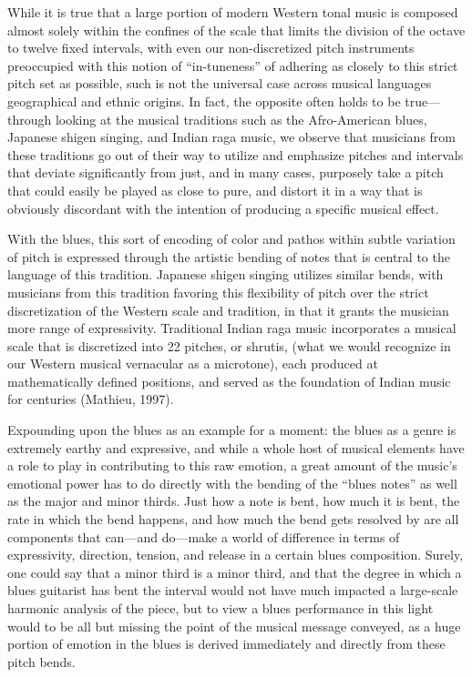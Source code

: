 While it is true that a large portion of modern Western tonal music is
composed almost solely within the confines of the scale that limits the
division of the octave to twelve fixed intervals, with even our
non-discretized pitch instruments preoccupied with this notion of
``in-tuneness'' of adhering as closely to this strict pitch set as
possible, such is not the universal case across musical languages
geographical and ethnic origins. In fact, the opposite often holds to be
true---through looking at the musical traditions such as the
Afro-American blues, Japanese shigen singing, and Indian raga music, we
observe that musicians from these traditions go out of their way to
utilize and emphasize pitches and intervals that deviate significantly
from just, and in many cases, purposely take a pitch that could easily
be played as close to pure, and distort it in a way that is obviously
discordant with the intention of producing a specific musical effect.

With the blues, this sort of encoding of color and pathos within subtle
variation of pitch is expressed through the artistic bending of notes
that is central to the language of this tradition. Japanese shigen
singing utilizes similar bends, with musicians from this tradition
favoring this flexibility of pitch over the strict discretization of the
Western scale and tradition, in that it grants the musician more range
of expressivity. Traditional Indian raga music incorporates a musical
scale that is discretized into 22 pitches, or shrutis, (what we would
recognize in our Western musical vernacular as a microtone), each
produced at mathematically defined positions, and served as the
foundation of Indian music for centuries (Mathieu, 1997).

Expounding upon the blues as an example for a moment: the blues as a
genre is extremely earthy and expressive, and while a whole host of
musical elements have a role to play in contributing to this raw
emotion, a great amount of the music's emotional power has to do
directly with the bending of the ``blues notes'' as well as the major
and minor thirds. Just how a note is bent, how much it is bent, the rate
in which the bend happens, and how much the bend gets resolved by are
all components that can---and do---make a world of difference in terms
of expressivity, direction, tension, and release in a certain blues
composition. Surely, one could say that a minor third is a minor third,
and that the degree in which a blues guitarist has bent the interval
would not have much impacted a large-scale harmonic analysis of the
piece, but to view a blues performance in this light would to be all but
missing the point of the musical message conveyed, as a huge portion of
emotion in the blues is derived immediately and directly from these
pitch bends.

